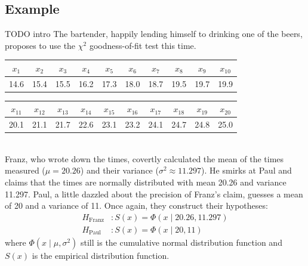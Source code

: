 \documentclass{article}
\begin{document}
\subsection{Example}
TODO intro
The bartender, happily lending himself to drinking one of the beers, proposes to use the $\chi^2$ goodness-of-fit test this time.
%
\begin{table}[h]
\center
\begin{tabular}{cccccccccc}
$x_1$	&$x_2$	&$x_3$	&$x_4$	&$x_5$	&$x_6$	&$x_7$	&$x_8$	&$x_9$	&$x_{10}$\\
\hline
14.6	&15.4	&15.5	&16.2	&17.3	&18.0	&18.7	&19.5	&19.7	&19.9	\\
\end{tabular}
\begin{tabular}{cccccccccc}
$x_{11}$	&$x_{12}$	&$x_{13}$	&$x_{14}$	&$x_{15}$	&$x_{16}$	&$x_{17}$	&$x_{18}$	&$x_{19}$	&$x_{20}$\\
\hline
20.1	&21.1	&21.7	&22.6	&23.1	&23.2	&24.1	&24.7	&24.8	&25.0	\\
\end{tabular}
\end{table}
\\
Franz, who wrote down the times, covertly calculated the mean of the times measured ($\mu = 20.26$) and their variance ($\sigma^2 \approx 11.297$).
He smirks at Paul and claims that the times are normally distributed with mean 20.26 and variance 11.297.
Paul, a little dazzled about the precision of Franz's claim, guesses a mean of 20 and a variance of 11.
Once again, they construct their hypotheses:
\begin{align*}
	H_{\text{Franz}} &: S(x) = \Phi(x\mid 20.26, 11.297)
	\\
	H_{\text{Paul}} &: S(x) = \Phi(x\mid 20, 11)
\end{align*}
where $\Phi(x\mid\mu,\sigma^2)$ still is the cumulative normal distribution function and $S(x)$ is the empirical distribution function.
\end{document}
